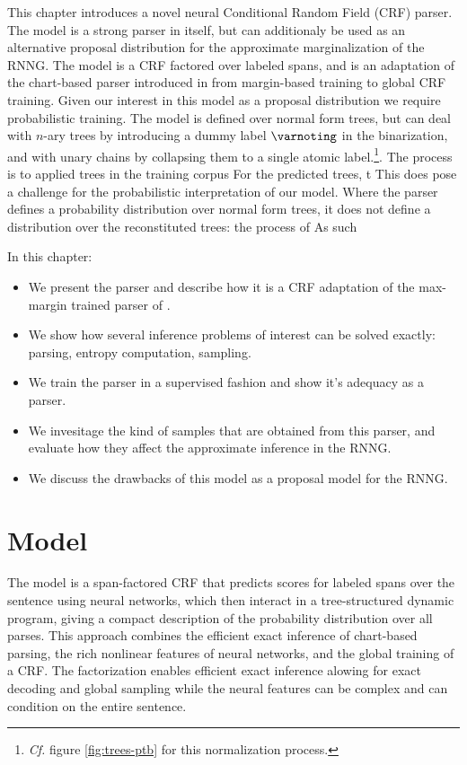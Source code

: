 % 

This chapter introduces a novel neural Conditional Random Field (CRF) parser. The model is a strong parser in itself, but can additionaly be used as an alternative proposal distribution for the approximate marginalization of the RNNG. The model is a CRF factored over labeled spans, and is an adaptation of the chart-based parser introduced in \citet{stern2017minimal} from margin-based training to global CRF training. Given our interest in this model as a proposal distribution we require probabilistic training. The model is defined over normal form trees, but can deal with $n$-ary trees by introducing a dummy label $\varnoting$ in the binarization, and with unary chains by collapsing them to a single atomic label.\footnote{\textit{Cf.} figure \ref{fig:trees-ptb} for this normalization process.}. The process is to applied trees in the training corpus For the predicted trees, t
This does pose a challenge for the probabilistic interpretation of our model. Where the parser defines a probability distribution over normal form trees, it does not define a distribution over the reconstituted trees: the process of  As such

In this chapter:
\begin{itemize}
  \item We present the parser and describe how it is a CRF adaptation of the max-margin trained parser of \citet{stern2017minimal}.
  \item We show how several inference problems of interest can be solved exactly: parsing, entropy computation, sampling.
  \item We train the parser in a supervised fashion and show it's adequacy as a parser.
  \item We invesitage the kind of samples that are obtained from this parser, and evaluate how they affect the approximate inference in the RNNG.
  \item We discuss the drawbacks of this model as a proposal model for the RNNG.
\end{itemize}

\section{Model}
 The model is a span-factored CRF that predicts scores for labeled spans over the sentence using neural networks, which then interact in a tree-structured dynamic program, giving a compact description of the probability distribution over all parses. This approach combines the efficient exact inference of chart-based parsing, the rich nonlinear features of neural networks, and the global training of a CRF. The factorization enables efficient exact inference alowing for exact decoding and global sampling while the neural features can be complex and can condition on the entire sentence.


